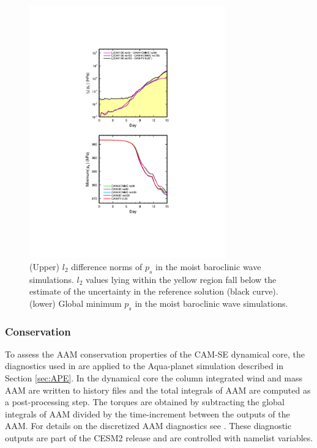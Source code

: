 \documentclass{agujournal}
\begin{document}
{\begin{figure}[h]
\centering
\includegraphics[width=20pc]{figs/l2.pdf}
\caption{(Upper) $l_2$ difference norms of $p_s$ in the moist baroclinic wave simulations. $l_2$ values lying within the yellow region fall below the estimate of the uncertainty in the reference solution (black curve). (lower) Global minimum $p_s$ in the moist baroclinic wave simulations.}
\label{fig:l2norm}
\end{figure}


\subsubsection{Conservation}
To assess the AAM conservation properties of the CAM-SE dynamical core, the diagnostics used in \cite{LBDL2014JAMES} are applied to the Aqua-planet simulation described in Section \ref{sec:APE}. In the dynamical core the column integrated wind and mass AAM are written to history files and the total integrals of AAM are computed as a post-processing step. The torques are obtained by subtracting the global integrals of AAM divided by the time-increment between the outputs of the AAM. For details on the discretized AAM diagnostics see \cite{LBDL2014JAMES}. These diagnostic outputs are part of the CESM2 release and are controlled with namelist variables.

}
\end{document}
